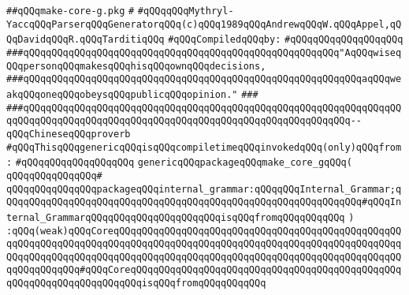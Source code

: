 \label{src/app/yacc/src/make-core-g.pkg}
\verb|##qQQqmake-core-g.pkg|\newline
\verb|#|\newline
\verb|#qQQqqQQqMythryl-YaccqQQqParserqQQqGeneratorqQQq(c)qQQq1989qQQqAndrewqQQqW.qQQqAppel,qQQqDavidqQQqR.qQQqTarditiqQQq|\newline
\newline
\verb|#qQQqCompiledqQQqby:|\newline
\verb|#qQQqqQQqqQQqqQQqqQQq|\newline
\newline
\newline
\newline
\verb|###qQQqqQQqqQQqqQQqqQQqqQQqqQQqqQQqqQQqqQQqqQQqqQQqqQQqqQQq"AqQQqwiseqQQqpersonqQQqmakesqQQqhisqQQqownqQQqdecisions,|\newline
\verb|###qQQqqQQqqQQqqQQqqQQqqQQqqQQqqQQqqQQqqQQqqQQqqQQqqQQqqQQqqQQqaqQQqweakqQQqoneqQQqobeysqQQqpublicqQQqopinion."|\newline
\verb|###|\newline
\verb|###qQQqqQQqqQQqqQQqqQQqqQQqqQQqqQQqqQQqqQQqqQQqqQQqqQQqqQQqqQQqqQQqqQQqqQQqqQQqqQQqqQQqqQQqqQQqqQQqqQQqqQQqqQQqqQQqqQQqqQQqqQQqqQQq--qQQqChineseqQQqproverb|\newline
\newline
\newline
\verb|#qQQqThisqQQqgenericqQQqisqQQqcompiletimeqQQqinvokedqQQq(only)qQQqfrom:|\newline
\verb|#qQQqqQQqqQQqqQQqqQQq|\newline
\newline
\verb|genericqQQqpackageqQQqmake_core_gqQQq(|\newline
\verb|qQQqqQQqqQQqqQQq#|\newline
\verb|qQQqqQQqqQQqqQQqpackageqQQqinternal_grammar:qQQqqQQqInternal_Grammar;qQQqqQQqqQQqqQQqqQQqqQQqqQQqqQQqqQQqqQQqqQQqqQQqqQQqqQQqqQQqqQQq#qQQqInternal_GrammarqQQqqQQqqQQqqQQqqQQqqQQqisqQQqfromqQQqqQQqqQQq|\newline
\verb|)|\newline
\verb|:qQQq(weak)qQQqCoreqQQqqQQqqQQqqQQqqQQqqQQqqQQqqQQqqQQqqQQqqQQqqQQqqQQqqQQqqQQqqQQqqQQqqQQqqQQqqQQqqQQqqQQqqQQqqQQqqQQqqQQqqQQqqQQqqQQqqQQqqQQqqQQqqQQqqQQqqQQqqQQqqQQqqQQqqQQqqQQqqQQqqQQqqQQqqQQqqQQqqQQqqQQqqQQqqQQqqQQqqQQq#qQQqCoreqQQqqQQqqQQqqQQqqQQqqQQqqQQqqQQqqQQqqQQqqQQqqQQqqQQqqQQqqQQqqQQqqQQqqQQqisqQQqfromqQQqqQQqqQQq|\newline
